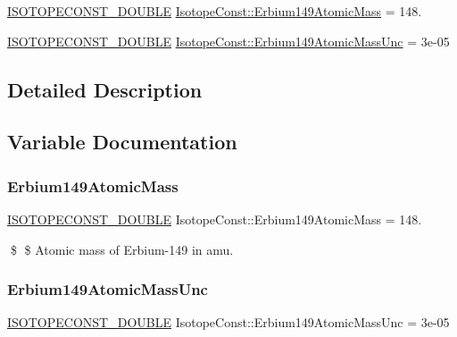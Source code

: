\begin{DoxyCompactItemize}
\item 
\mbox{\hyperlink{group___isotope_const-_macros_ga8f45a7272ce02c0b4c65c44636ed719a}{I\+S\+O\+T\+O\+P\+E\+C\+O\+N\+S\+T\+\_\+\+D\+O\+U\+B\+LE}} \mbox{\hyperlink{group___isotope_const-_erbium-_er149_ga4a7269bce4d5695ec59c4c0b31bff830}{Isotope\+Const\+::\+Erbium149\+Atomic\+Mass}} = 148.
\item 
\mbox{\hyperlink{group___isotope_const-_macros_ga8f45a7272ce02c0b4c65c44636ed719a}{I\+S\+O\+T\+O\+P\+E\+C\+O\+N\+S\+T\+\_\+\+D\+O\+U\+B\+LE}} \mbox{\hyperlink{group___isotope_const-_erbium-_er149_ga6e61dde09169a7f05a288bbd05ccea17}{Isotope\+Const\+::\+Erbium149\+Atomic\+Mass\+Unc}} = 3e-\/05
\end{DoxyCompactItemize}


\subsection{Detailed Description}


\subsection{Variable Documentation}
\mbox{\label{group___isotope_const-_erbium-_er149_ga4a7269bce4d5695ec59c4c0b31bff830}} 
\subsubsection{\texorpdfstring{Erbium149\+Atomic\+Mass}{Erbium149AtomicMass}}
{\footnotesize\ttfamily \mbox{\hyperlink{group___isotope_const-_macros_ga8f45a7272ce02c0b4c65c44636ed719a}{I\+S\+O\+T\+O\+P\+E\+C\+O\+N\+S\+T\+\_\+\+D\+O\+U\+B\+LE}} Isotope\+Const\+::\+Erbium149\+Atomic\+Mass = 148.}

\$ \$ Atomic mass of Erbium-\/149 in amu. \mbox{\label{group___isotope_const-_erbium-_er149_ga6e61dde09169a7f05a288bbd05ccea17}} 
\subsubsection{\texorpdfstring{Erbium149\+Atomic\+Mass\+Unc}{Erbium149AtomicMassUnc}}
{\footnotesize\ttfamily \mbox{\hyperlink{group___isotope_const-_macros_ga8f45a7272ce02c0b4c65c44636ed719a}{I\+S\+O\+T\+O\+P\+E\+C\+O\+N\+S\+T\+\_\+\+D\+O\+U\+B\+LE}} Isotope\+Const\+::\+Erbium149\+Atomic\+Mass\+Unc = 3e-\/05}

